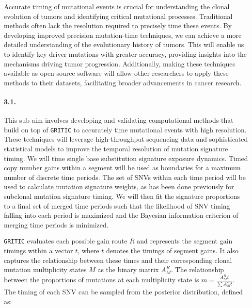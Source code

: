 Accurate timing of mutational events is crucial for understanding the clonal evolution of 
tumors and identifying critical mutational processes. 
Traditional methods often lack the resolution required to precisely time these events. 
By developing improved precision mutation-time techniques, 
we can achieve a more detailed understanding of the evolutionary history of tumors. 
This will enable us to identify key driver mutations with greater accuracy, 
providing insights into the mechanisms driving tumor progression. 
Additionally, making these techniques available as open-source software will allow other researchers to 
apply these methods to their datasets, facilitating broader advancements in cancer research.

\paragraph{3.1. \SpecificAimThreeA}

This sub-aim involves developing and validating computational methods that build on top of \texttt{GRITIC} 
to accurately time mutational events with high resolution.
These techniques will leverage high-throughput sequencing data and 
sophisticated statistical models to improve the temporal resolution of mutation signature timing.
We will time single base substitution signature exposure dynamics. 
Timed copy number gains within a segment will be used as boundaries for a maximum number of 
discrete time periods. 
The set of SNVs within each time period will be used to calculate mutation signature weights, 
as has been done previously for subclonal mutation signature timing. 
We will then fit the signature proportions to a final set of merged time periods such that the 
likelihood of SNV timing falling into each period is maximized and the 
Bayesian information criterion of merging time periods is minimized.


\vspace{1em}
\noindent
\texttt{GRITIC} evaluates each possible gain route \( R \) and 
represents the segment gain timings within a vector \( t \), 
where \( t \) denotes the timings of segment gains. 
It also captures the relationship between these times and their corresponding 
clonal mutation multiplicity states $M$ as the binary matrix $A_M^R$. 
The relationship between the proportions of mutations at each multiplicity state is \(m = \frac{A_M^R t}{\sum A_M^R t}\).
The timing of each SNV can be sampled from the posterior distribution, defined as:

